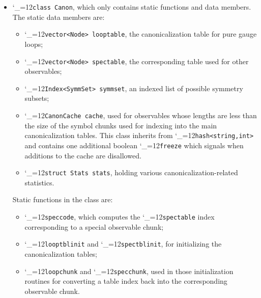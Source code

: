 \documentclass [12pt]{article}
\makeatletter
\renewcommand{\tt}{\begingroup\catcode`_=12\def\_{\string_}\tt@}
\newcommand{\tt@}[1]{\texttt{#1}\endgroup}
\makeatother
\begin{document}
\begin{itemize}
\item
    \tt{class Canon}, which only contains
    static functions and data members.
    The static data members are:
    \begin{itemize}
    \item
    \tt{vector<Node> looptable},
    the canonicalization table for pure gauge loops;
    \item
    \tt{vector<Node> spectable},
    the corresponding table used for other observables;
    \item
    \tt{Index<SymmSet> symmset},
    an indexed list of possible symmetry subsets;
    \item
    \tt{CanonCache cache},
    used for observables whose lengths are
    less than the size of the symbol chunks
    used for indexing into the main canonicalization tables.
    This class inherits from \tt{hash<string,int>}
    and contains one additional boolean \tt{freeze}
    which signals when additions to the cache are disallowed.
    \item
    \tt{struct Stats stats},
    holding various canonicalization-related statistics.
    \end{itemize}
    Static functions in the class are:
    \begin{itemize}
    \item
    \tt{speccode}, which computes the
    \tt{spectable} index corresponding to
    a special observable chunk;
    \item
    \tt{looptblinit} and \tt{spectblinit}, for initializing
    the canonicalization tables;
    \item
    \tt{loopchunk} and \tt{specchunk}, used in those
    initialization routines for converting a table index
    back into the corresponding observable chunk.
    \end{itemize}

\end{itemize}
\end{document}
